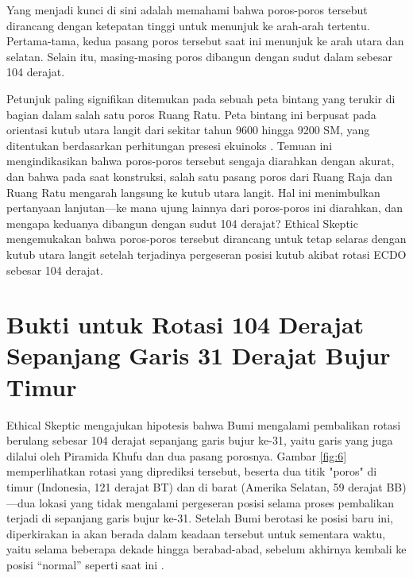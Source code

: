 \documentclass[10pt,twocolumn,letterpaper]{article}
\begin{document}
Yang menjadi kunci di sini adalah memahami bahwa poros-poros tersebut dirancang dengan ketepatan tinggi untuk menunjuk ke arah-arah tertentu. Pertama-tama, kedua pasang poros tersebut saat ini menunjuk ke arah utara dan selatan. Selain itu, masing-masing poros dibangun dengan sudut dalam sebesar 104 derajat.

Petunjuk paling signifikan ditemukan pada sebuah peta bintang yang terukir di bagian dalam salah satu poros Ruang Ratu. Peta bintang ini berpusat pada orientasi kutub utara langit dari sekitar tahun 9600 hingga 9200 SM, yang ditentukan berdasarkan perhitungan presesi ekuinoks \cite{28}. Temuan ini mengindikasikan bahwa poros-poros tersebut sengaja diarahkan dengan akurat, dan bahwa pada saat konstruksi, salah satu pasang poros dari Ruang Raja dan Ruang Ratu mengarah langsung ke kutub utara langit. Hal ini menimbulkan pertanyaan lanjutan—ke mana ujung lainnya dari poros-poros ini diarahkan, dan mengapa keduanya dibangun dengan sudut 104 derajat? Ethical Skeptic mengemukakan bahwa poros-poros tersebut dirancang untuk tetap selaras dengan kutub utara langit setelah terjadinya pergeseran posisi kutub akibat rotasi ECDO sebesar 104 derajat.

\section{Bukti untuk Rotasi 104 Derajat Sepanjang Garis 31 Derajat Bujur Timur}

Ethical Skeptic mengajukan hipotesis bahwa Bumi mengalami pembalikan rotasi berulang sebesar 104 derajat sepanjang garis bujur ke-31, yaitu garis yang juga dilalui oleh Piramida Khufu dan dua pasang porosnya. Gambar \ref{fig:6} memperlihatkan rotasi yang diprediksi tersebut, beserta dua titik "poros" di timur (Indonesia, 121 derajat BT) dan di barat (Amerika Selatan, 59 derajat BB)—dua lokasi yang tidak mengalami pergeseran posisi selama proses pembalikan terjadi di sepanjang garis bujur ke-31. Setelah Bumi berotasi ke posisi baru ini, diperkirakan ia akan berada dalam keadaan tersebut untuk sementara waktu, yaitu selama beberapa dekade hingga berabad-abad, sebelum akhirnya kembali ke posisi “normal” seperti saat ini \cite{150}.
\end{document}
